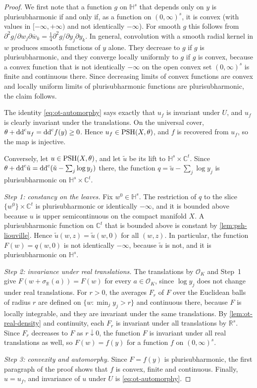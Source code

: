 \begin{proof}
We first note that a function $g$ on $\mathbb H^s$ that depends only on $y$ is plurisubharmonic if and only if, as a function on $(0,\infty)^s$, it is convex (with values in $[-\infty,+\infty)$ and not identically $-\infty$). For smooth $g$ this follows from $\partial^2g/\partial w_j\partial\overline w_k=\frac14\partial^2g/\partial y_j\partial y_k$. In general, convolution with a smooth radial kernel in $w$ produces smooth functions of $y$ alone. They decrease to $g$ if $g$ is plurisubharmonic, and they converge locally uniformly to $g$ if $g$ is convex, because a convex function that is not identically $-\infty$ on the open convex set $(0,\infty)^s$ is finite and continuous there. Since decreasing limits of convex functions are convex and locally uniform limits of plurisubharmonic functions are plurisubharmonic, the claim follows.

The identity \eqref{eq:ot-automorphy} says exactly that $u_f$ is invariant under $U$, and $u_f$ is clearly invariant under the translations. On the universal cover, $\theta+\mathrm{dd}^{\mathrm{c}} u_f=\mathrm{dd}^{\mathrm{c}} f(y)\geq0$. Hence $u_f\in\mathrm{PSH}(X,\theta)$, and $f$ is recovered from $u_f$, so the map is injective.

Conversely, let $u\in\mathrm{PSH}(X,\theta)$, and let $\tilde u$ be its lift to $\mathbb H^s\times\mathbb C^t$. Since $\theta+\mathrm{dd}^{\mathrm{c}}\tilde u=\mathrm{dd}^{\mathrm{c}}(\tilde u-\sum_j\log y_j)$ there, the function $q=\tilde u-\sum_j\log y_j$ is plurisubharmonic on $\mathbb H^s\times\mathbb C^t$.

\emph{Step 1: constancy on the leaves.} Fix $w^0\in\mathbb H^s$. The restriction of $q$ to the slice $\{w^0\}\times\mathbb C^t$ is plurisubharmonic or identically $-\infty$, and it is bounded above because $u$ is upper semicontinuous on the compact manifold $X$. A plurisubharmonic function on $\mathbb C^t$ that is bounded above is constant by \cref{lem:psh-liouville}. Hence $\tilde u(w,z)=\tilde u(w,0)$ for all $(w,z)$. In particular, the function $F(w)=q(w,0)$ is not identically $-\infty$, because $\tilde u$ is not, and it is plurisubharmonic on $\mathbb H^s$.

\emph{Step 2: invariance under real translations.} The translations by $\mathcal O_K$ and Step~1 give $F(w+\sigma_{\mathbb R}(a))=F(w)$ for every $a\in\mathcal O_K$, since $\log y_j$ does not change under real translations. For $r>0$, the averages $F_r$ of $F$ over the Euclidean balls of radius $r$ are defined on $\{w:\min_jy_j>r\}$ and continuous there, because $F$ is locally integrable, and they are invariant under the same translations. By \cref{lem:ot-real-density} and continuity, each $F_r$ is invariant under all translations by $\mathbb R^s$. Since $F_r$ decreases to $F$ as $r\downarrow0$, the function $F$ is invariant under all real translations as well, so $F(w)=f(y)$ for a function $f$ on $(0,\infty)^s$.

\emph{Step 3: convexity and automorphy.} Since $F=f(y)$ is plurisubharmonic, the first paragraph of the proof shows that $f$ is convex, finite and continuous. Finally, $u=u_f$, and invariance of $u$ under $U$ is \eqref{eq:ot-automorphy}.
\end{proof}

